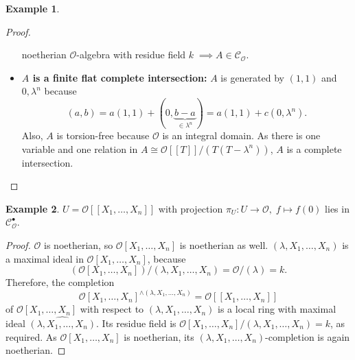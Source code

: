 \documentclass{article}
\theoremstyle{plain}%
\theoremstyle{definition}
\newtheorem{example}{Example}[section]
\theoremstyle{remark}
\newcommand{\cob}{\mathcal{C}_\mathcal{O}^\bullet}
\newcommand{\co}{\mathcal{C}_\mathcal{O}}
\begin{document}
\begin{example}
\begin{proof}
\begin{itemize}
                noetherian \(\mathcal{O}\)-algebra with residue field \(k\; \implies A \in \co\). 
            \item \textbf{\(A\) is a finite flat complete intersection:}
                \(A\) is generated by \((1,1)\) and \(0, \lambda^n\) because
                \[
                    (a,b) = a(1,1) + (0, \underbrace{b-a}_{\in \lambda^n}) = a(1,1) + c(0, \lambda^n).
                \]
                Also, \(A\) is torsion-free because \(\mathcal{O}\) is an integral domain. 
                As there is one variable and one relation in \(A \cong \mathcal{O}[[T]]/(T(T-\lambda^n))\),
                \(A\) is a complete intersection.
        \end{itemize}
    \end{proof}
\end{example}


\begin{example}\label{ex:last_1}\cite[cf.][example 5]{darmon1995fermat}
    \(U = \mathcal{O}[[X_1, \dots, X_n]]\) with projection \(\pi_U\colon U \to \mathcal{O},\; f \mapsto f(0)\) lies in \(\cob\).
    \begin{proof}
        \(\mathcal{O}\) is noetherian, so \(\mathcal{O}[X_1, \dots, X_{n}]\) is noetherian as well.
        \((\lambda, X_1, \dots, X_n)\) is a maximal ideal in \(\mathcal{O}[X_1, \dots, X_n]\), because
        \[\left(\mathcal{O}[X_1, \dots, X_n]\right)/(\lambda, X_1, \dots, X_n) = \mathcal{O}/(\lambda) = k.\]
        Therefore, the completion \[\mathcal{O}[X_1, \dots, X_n]^{\wedge(\lambda, X_1, \dots, X_n)} = \mathcal{O}[[X_1, \dots, X_n]]\]
        of \(\mathcal{O}[X_1, \dots, X_n]\) with respect to \((\lambda, X_1, \dots, X_n)\) is a local ring with maximal ideal
        \(\widehat{(\lambda, X_1, \dots, X_n)}\).
        Its residue field is \(\mathcal{O}[X_1, \dots, X_n]/(\lambda, X_1, \dots, X_n) = k\), as required.
        As \(\mathcal{O}[X_1, \dots, X_n]\) is noetherian, its \((\lambda, X_1, \dots, X_n)\)-completion is again noetherian.
    \end{proof}
\end{example}
\end{document}

